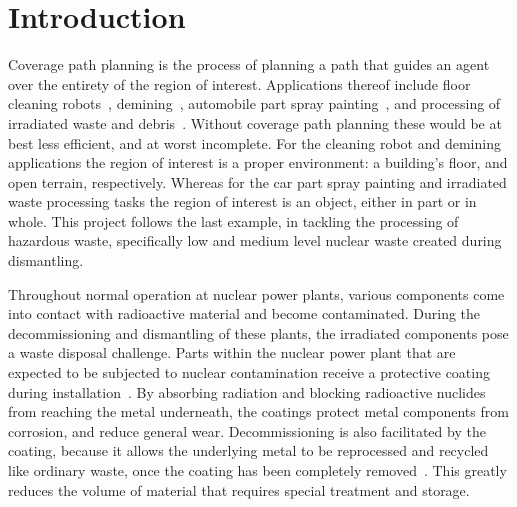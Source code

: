 \chapter{Introduction}
Coverage path planning is the process of planning a path that guides an agent over the entirety of the region of interest.
Applications thereof include floor cleaning robots~\cite{CCPP_cleaning_robots}, demining~\cite{CPP_demining}, automobile part spray painting~\cite{Automatic_spray_painting_path}, and processing of irradiated waste and debris~\cite{ROBBE}.
Without coverage path planning these would be at best less efficient, and at worst incomplete.
For the cleaning robot and demining applications the region of interest is a proper environment: a building's floor, and open terrain, respectively.
Whereas for the car part spray painting and irradiated waste processing tasks the region of interest is an object, either in part or in whole.
This project follows the last example, in tackling the processing of hazardous waste, specifically low and medium level nuclear waste created during dismantling.

Throughout normal operation at nuclear power plants, various components come into contact with radioactive material and become contaminated.
During the decommissioning and dismantling of these plants, the irradiated components pose a waste disposal challenge.
Parts within the nuclear power plant that are expected to be subjected to nuclear contamination receive a protective coating during installation~\cite{NRC_coatings}.
By absorbing radiation and blocking radioactive nuclides from reaching the metal underneath, the coatings protect metal components from corrosion, and reduce general wear.
Decommissioning is also facilitated by the coating, because it allows the underlying metal to be reprocessed and recycled like ordinary waste, once the coating has been completely removed~\cite{DeconTechInDecommissioning}.
This greatly reduces the volume of material that requires special treatment and storage.

